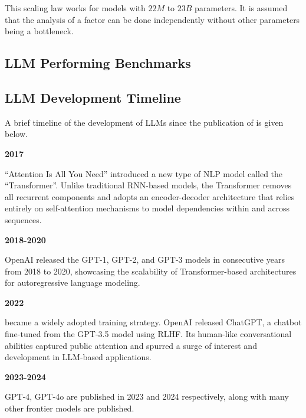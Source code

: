 This scaling law works for models with $22M$ to $23B$ parameters. It is assumed that the analysis of a factor can be done independently without other parameters being a bottleneck.

\subsection{LLM Performing Benchmarks}

\subsection{LLM Development Timeline}

A brief timeline of the development of LLMs since the publication of \cite{vaswani2017attention} is given below.

\vspace{0.1in}
\noindent \textbf{2017}
\vspace{0.1in}

``Attention Is All You Need'' \cite{vaswani2017attention} introduced a new type of NLP model called the ``Transformer''. Unlike traditional RNN-based models, the Transformer removes all recurrent components and adopts an encoder-decoder architecture that relies entirely on self-attention mechanisms to model dependencies within and across sequences.

\vspace{0.1in}
\noindent \textbf{2018-2020}
\vspace{0.1in}

OpenAI released the GPT-1, GPT-2, and GPT-3 models in consecutive years from 2018 to 2020, showcasing the scalability of Transformer-based architectures for autoregressive language modeling.

\vspace{0.1in}
\noindent \textbf{2022}
\vspace{0.1in}

 became a widely adopted training strategy. OpenAI released ChatGPT, a chatbot fine-tuned from the GPT-3.5 model using RLHF. Its human-like conversational abilities captured public attention and spurred a surge of interest and development in LLM-based applications.

\vspace{0.1in}
\noindent \textbf{2023-2024}
\vspace{0.1in}

GPT-4, GPT-4o are published in 2023 and 2024 respectively, along with many other frontier models are published.

